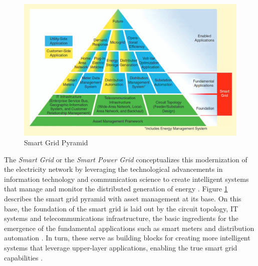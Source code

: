 \begin{figure}[h!]
	\centering
	\includegraphics[width=0.74\linewidth]{./figures/smart_grid.png}
	\caption{Smart Grid Pyramid \cite{farhangiPathSmartGrid2010}}
	\label{fig:smart-grid}
\end{figure}


The \textit{Smart Grid} or the \textit{Smart Power Grid} conceptualizes this modernization of the electricity network by leveraging the technological advancements in information technology and communication science to create intelligent systems that manage and monitor the distributed generation of energy \cite{bayindirSmartGridTechnologies2016, farhangiPathSmartGrid2010}. Figure \ref{fig:smart-grid} describes the smart grid pyramid with asset management at its base. On this base, the foundation of the smart grid is laid out by the circuit topology, \acs{IT} systems and telecommunications infrastructure, the basic ingredients for the emergence of the fundamental applications such as smart meters and distribution automation \cite{farhangiPathSmartGrid2010}. In turn, these serve as building blocks for creating more intelligent systems that leverage upper-layer applications, enabling the true smart grid capabilities \cite{farhangiPathSmartGrid2010}.
